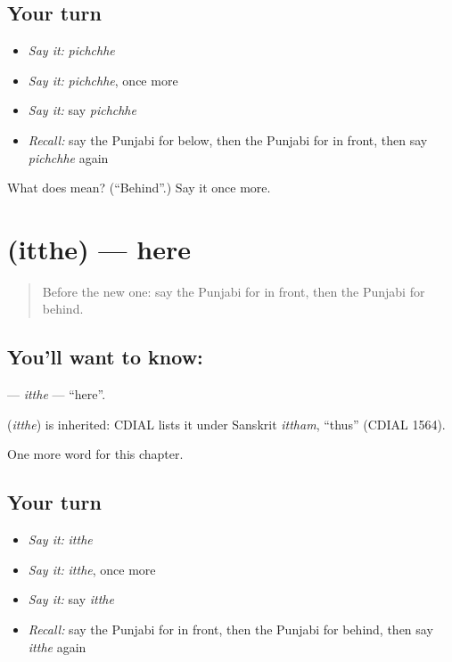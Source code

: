 \subsection*{Your turn}
\begin{itemize}
\raggedright
  \item \emph{Say it:} \emph{pichchhe}
  \item \emph{Say it:} \emph{pichchhe}, once more
  \item \emph{Say it:} say \emph{pichchhe}
  \item \emph{Recall:} say the Punjabi for below, then the Punjabi for in front, then say \emph{pichchhe} again
\end{itemize}

\begin{tcolorbox}[breakable,colback=teal!4,colframe=teal!35!black,title={Before you move on}]
What does  mean? (\textquotedblleft{}Behind\textquotedblright{}.) Say it once more.
\end{tcolorbox}
\section[\texorpdfstring{\pa{ਇੱਥੇ} (itthe)}{ਇੱਥੇ (itthe)}]{ (itthe) — here}

\label{lesson:PA-C89-itthe}



\begin{quote}
Before the new one: say the Punjabi for in front, then the Punjabi for behind.
\end{quote}

\subsection*{You'll want to know: }
\textbf{} — \emph{itthe} — \textquotedblleft{}here\textquotedblright{}.

\begin{cousinweb}
\textbf{} (\emph{itthe}) is inherited: CDIAL lists it under Sanskrit \emph{ittham}, \textquotedblleft{}thus\textquotedblright{} (CDIAL 1564).
\end{cousinweb}

\begin{grammarlens}[title={What you've built}]
One more word for this chapter.
\end{grammarlens}

\subsection*{Your turn}
\begin{itemize}
\raggedright
  \item \emph{Say it:} \emph{itthe}
  \item \emph{Say it:} \emph{itthe}, once more
  \item \emph{Say it:} say \emph{itthe}
  \item \emph{Recall:} say the Punjabi for in front, then the Punjabi for behind, then say \emph{itthe} again
\end{itemize}

